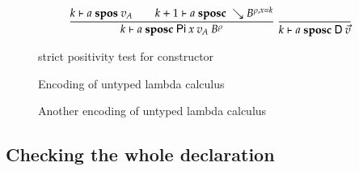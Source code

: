 \begin{figure}[htp]
\begin{gather*}
\ \dfrac{ k\vdash a\mbox{ \textbf{spos} }v_A \qquad k+1\vdash a\mbox{ \textbf{sposc} }\searrow B^{\rho,x=k}}{k\vdash a\mbox{ \textbf{sposc} }\mathsf{Pi} \: x \: v_A \: B^{\rho}  }
\ \dfrac{}{k\vdash a\mbox{ \textbf{sposc} }\mathsf{D} \: \vec{v}}
\end{gather*}
\caption{strict positivity test for constructor}
\label{sposcf}
\end{figure}

\begin{figure}[htp]
\caption{Encoding of untyped lambda calculus}
\label{abs1}
\end{figure}

\begin{figure}[htp]
\caption{Another encoding of untyped lambda calculus}
\label{abs2}
\end{figure}

\newpage

\subsection{Checking the whole declaration}

